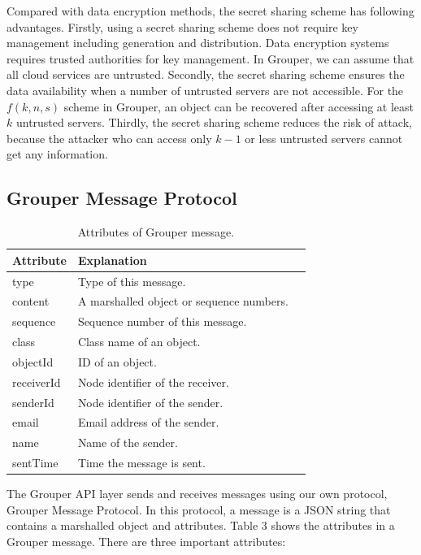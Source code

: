 \documentclass[twocolumn,10pt]{article}
\begin{document}
Compared with data encryption methods, the secret sharing scheme has following advantages.
Firstly, using a secret sharing scheme does not require key management including generation and distribution.
Data encryption systems requires trusted authorities for key management.
In Grouper, we can assume that all cloud services are untrusted.
Secondly, the secret sharing scheme ensures the data availability when a number of untrusted servers are not accessible.
For the $f(k, n, s)$ scheme in Grouper, an object can be recovered after accessing at least $k$ untrusted servers.
Thirdly, the secret sharing scheme reduces the risk of attack, because the attacker who can access only $k-1$ or less untrusted servers cannot get any information.

\subsection{Grouper Message Protocol}

\begin{table}[t]
	\centering
	\caption{Attributes of Grouper message.}
	\label{my-label}
	\begin{tabular}{lll}
		\hline
		\textbf{Attribute} & \textbf{Explanation} \\ \hline
		type & Type of this message. \\
		content & A marshalled object or sequence numbers. \\
		sequence & Sequence number of this message. \\
		class & Class name of an object. \\
		objectId & ID of an object. \\
		receiverId & Node identifier of the receiver. \\
		senderId & Node identifier of the sender. \\
		email & Email address of the sender. \\
		name & Name of the sender. \\
		sentTime & Time the message is sent. \\
		\hline
	\end{tabular}
\end{table}

The Grouper API layer sends and receives messages using our own protocol, Grouper Message Protocol.
In this protocol, a message is a JSON string that contains a marshalled object and attributes.
Table 3 shows the attributes in a Grouper message.
There are three important attributes:
\end{document}
